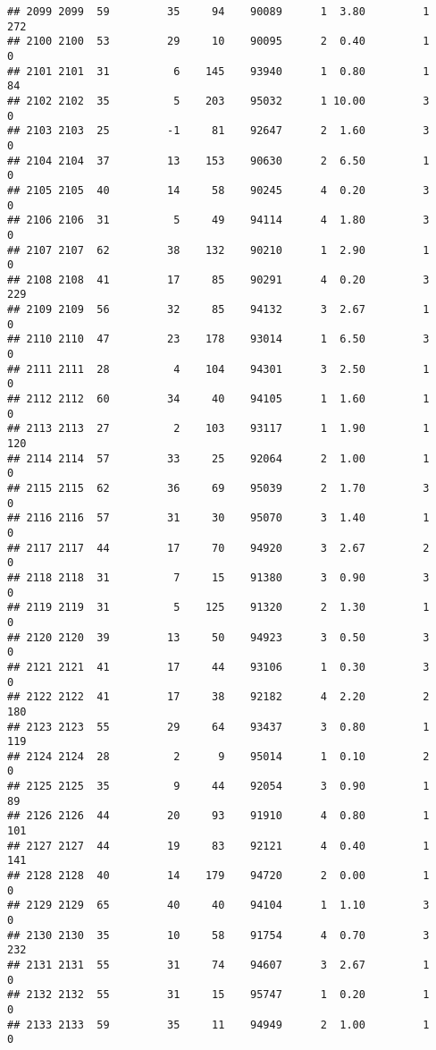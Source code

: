 \documentclass[
]{article}
\begin{document}
\begin{verbatim}
## 2099 2099  59         35     94    90089      1  3.80         1      272
## 2100 2100  53         29     10    90095      2  0.40         1        0
## 2101 2101  31          6    145    93940      1  0.80         1       84
## 2102 2102  35          5    203    95032      1 10.00         3        0
## 2103 2103  25         -1     81    92647      2  1.60         3        0
## 2104 2104  37         13    153    90630      2  6.50         1        0
## 2105 2105  40         14     58    90245      4  0.20         3        0
## 2106 2106  31          5     49    94114      4  1.80         3        0
## 2107 2107  62         38    132    90210      1  2.90         1        0
## 2108 2108  41         17     85    90291      4  0.20         3      229
## 2109 2109  56         32     85    94132      3  2.67         1        0
## 2110 2110  47         23    178    93014      1  6.50         3        0
## 2111 2111  28          4    104    94301      3  2.50         1        0
## 2112 2112  60         34     40    94105      1  1.60         1        0
## 2113 2113  27          2    103    93117      1  1.90         1      120
## 2114 2114  57         33     25    92064      2  1.00         1        0
## 2115 2115  62         36     69    95039      2  1.70         3        0
## 2116 2116  57         31     30    95070      3  1.40         1        0
## 2117 2117  44         17     70    94920      3  2.67         2        0
## 2118 2118  31          7     15    91380      3  0.90         3        0
## 2119 2119  31          5    125    91320      2  1.30         1        0
## 2120 2120  39         13     50    94923      3  0.50         3        0
## 2121 2121  41         17     44    93106      1  0.30         3        0
## 2122 2122  41         17     38    92182      4  2.20         2      180
## 2123 2123  55         29     64    93437      3  0.80         1      119
## 2124 2124  28          2      9    95014      1  0.10         2        0
## 2125 2125  35          9     44    92054      3  0.90         1       89
## 2126 2126  44         20     93    91910      4  0.80         1      101
## 2127 2127  44         19     83    92121      4  0.40         1      141
## 2128 2128  40         14    179    94720      2  0.00         1        0
## 2129 2129  65         40     40    94104      1  1.10         3        0
## 2130 2130  35         10     58    91754      4  0.70         3      232
## 2131 2131  55         31     74    94607      3  2.67         1        0
## 2132 2132  55         31     15    95747      1  0.20         1        0
## 2133 2133  59         35     11    94949      2  1.00         1        0

\end{verbatim}
\end{document}

